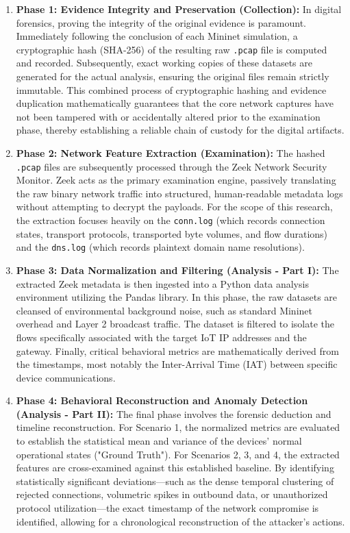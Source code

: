 \begin{enumerate}
	\item \textbf{Phase 1: Evidence Integrity and Preservation (Collection):} 
	In digital forensics, proving the integrity of the original evidence is paramount. Immediately following the conclusion of each Mininet simulation, a cryptographic hash (SHA-256) of the resulting raw \texttt{.pcap} file is computed and recorded. Subsequently, exact working copies of these datasets are generated for the actual analysis, ensuring the original files remain strictly immutable. This combined process of cryptographic hashing and evidence duplication mathematically guarantees that the core network captures have not been tampered with or accidentally altered prior to the examination phase, thereby establishing a reliable chain of custody for the digital artifacts.
	
	\item \textbf{Phase 2: Network Feature Extraction (Examination):} 
	The hashed \texttt{.pcap} files are subsequently processed through the Zeek Network Security Monitor. Zeek acts as the primary examination engine, passively translating the raw binary network traffic into structured, human-readable metadata logs without attempting to decrypt the payloads. For the scope of this research, the extraction focuses heavily on the \texttt{conn.log} (which records connection states, transport protocols, transported byte volumes, and flow durations) and the \texttt{dns.log} (which records plaintext domain name resolutions).
	
	\item \textbf{Phase 3: Data Normalization and Filtering (Analysis - Part I):} 
	The extracted Zeek metadata is then ingested into a Python data analysis environment utilizing the Pandas library. In this phase, the raw datasets are cleansed of environmental background noise, such as standard Mininet overhead and Layer 2 broadcast traffic. The dataset is filtered to isolate the flows specifically associated with the target IoT IP addresses and the gateway. Finally, critical behavioral metrics are mathematically derived from the timestamps, most notably the Inter-Arrival Time (IAT) between specific device communications.
	
	\item \textbf{Phase 4: Behavioral Reconstruction and Anomaly Detection (Analysis - Part II):} 
	The final phase involves the forensic deduction and timeline reconstruction. For Scenario 1, the normalized metrics are evaluated to establish the statistical mean and variance of the devices' normal operational states ("Ground Truth"). For Scenarios 2, 3, and 4, the extracted features are cross-examined against this established baseline. By identifying statistically significant deviations—such as the dense temporal clustering of rejected connections, volumetric spikes in outbound data, or unauthorized protocol utilization—the exact timestamp of the network compromise is identified, allowing for a chronological reconstruction of the attacker's actions.
\end{enumerate}

